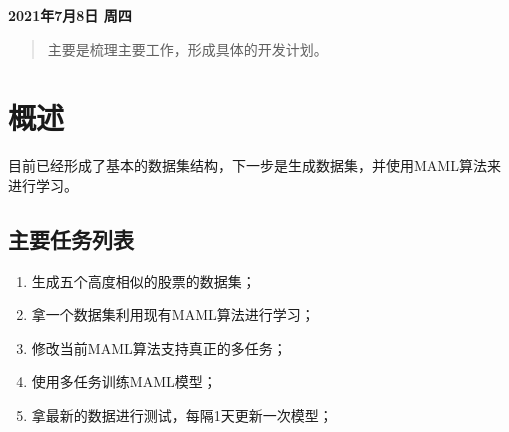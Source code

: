\newpage
\maketitle
\begin{center}
\Large \textbf{2021年7月8日 周四} \quad 
\end{center}
\begin{abstract}
主要是梳理主要工作，形成具体的开发计划。
\end{abstract}
\section{概述}
目前已经形成了基本的数据集结构，下一步是生成数据集，并使用MAML算法来进行学习。
\subsection{主要任务列表}
\begin{enumerate}
    \item 生成五个高度相似的股票的数据集；
    \item 拿一个数据集利用现有MAML算法进行学习；
    \item 修改当前MAML算法支持真正的多任务；
    \item 使用多任务训练MAML模型；
    \item 拿最新的数据进行测试，每隔1天更新一次模型；
\end{enumerate}
